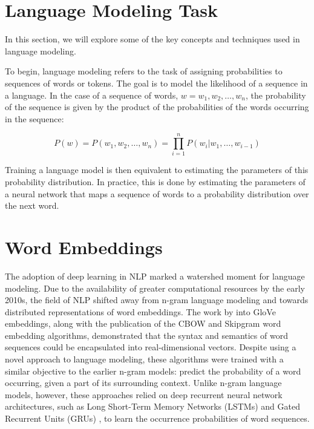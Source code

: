 
\section{Language Modeling Task}

In this section, we will explore some of the key concepts and techniques used in language modeling. 

To begin, language modeling refers to the task of assigning probabilities to sequences of words or tokens. The goal is to model the likelihood of a sequence in a language. In the case of a sequence of words, $w = w_1, w_2, \ldots, w_n$, the probability of the sequence is given by the product of the probabilities of the words occurring in the sequence:

\begin{equation}    
    P(w) = P(w_1, w_2, \ldots, w_n) = \prod_{i=1}^n P(w_i | w_1, \ldots, w_{i-1})
\end{equation}

Training a language model is then equivalent to estimating the parameters of this probability distribution. In practice, this is done by estimating the parameters of a neural network that maps a sequence of words to a probability distribution over the next word. 





\section{Word Embeddings}

The adoption of deep learning in NLP marked a watershed moment for language modeling. Due to the availability of greater computational resources by the early 2010s, the field of NLP shifted away from n-gram language modeling and towards distributed representations of word embeddings. The work by \cite{pennington2014glove} into GloVe embeddings, along with the publication of the CBOW \citep{mikolov2013efficient} and Skipgram \citep{mikolov2013distributed, mikolov2013efficient} word embedding algorithms, demonstrated that the syntax and semantics of word sequences could be encapsulated into real-dimensional vectors. Despite using a novel approach to language modeling, these algorithms were trained with a similar objective to the earlier n-gram models: predict the probability of a word occurring, given a part of its surrounding context. Unlike n-gram language models, however, these approaches relied on deep recurrent neural network architectures, such as Long Short-Term Memory Networks (LSTMs) \citep{hochreiter1997long} and Gated Recurrent Units (GRUs) \citep{cho2014properties}, to learn the occurrence probabilities of word sequences. 


